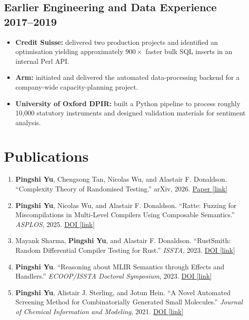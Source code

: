 \documentclass[10pt]{article}
\newcommand{\rside}[1]{\hfill {\normalfont\color{accent} #1}}
\newcommand{\linkicon}{{\color{gray}\footnotesize[link]}}
\begin{document}
\subsection{Earlier Engineering and Data Experience \rside{2017--2019}}
\begin{itemize}
  \item \textbf{Credit Suisse:} delivered two production projects and identified an optimisation yielding approximately $900\times$ faster bulk SQL inserts in an internal Perl API.
  \item \textbf{Arm:} initiated and delivered the automated data-processing backend for a company-wide capacity-planning project.
  \item \textbf{University of Oxford DPIR:} built a Python pipeline to process roughly 10,000 statutory instruments and designed validation materials for sentiment analysis.
\end{itemize}

\section{Publications}

\begin{enumerate}
  \item \textbf{Pingshi Yu}, Chengsong Tan, Nicolas Wu, and Alastair F. Donaldson. ``Complexity Theory of Randomised Testing.'' arXiv, 2026. \href{https://arxiv.org/abs/2607.11811}{Paper \linkicon}
  \item \textbf{Pingshi Yu}, Nicolas Wu, and Alastair F. Donaldson. ``Ratte: Fuzzing for Miscompilations in Multi-Level Compilers Using Composable Semantics.'' \textit{ASPLOS}, 2025. \href{https://doi.org/10.1145/3676641.3716270}{DOI \linkicon}
  \item Mayank Sharma, \textbf{Pingshi Yu}, and Alastair F. Donaldson. ``RustSmith: Random Differential Compiler Testing for Rust.'' \textit{ISSTA}, 2023. \href{https://doi.org/10.1145/3597926.3604919}{DOI \linkicon}
  \item \textbf{Pingshi Yu}. ``Reasoning about MLIR Semantics through Effects and Handlers.'' \textit{ECOOP/ISSTA Doctoral Symposium}, 2023. \href{https://doi.org/10.1145/3597926.3605239}{DOI \linkicon}
  \item \textbf{Pingshi Yu}, Alistair J. Sterling, and Jotun Hein. ``A Novel Automated Screening Method for Combinatorially Generated Small Molecules.'' \textit{Journal of Chemical Information and Modeling}, 2021. \href{https://doi.org/10.1021/acs.jcim.0c01462}{DOI \linkicon}
\end{enumerate}
\end{document}
